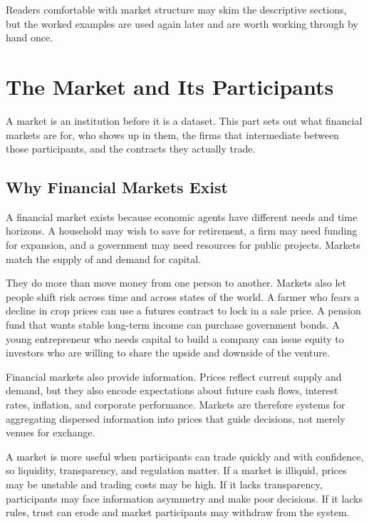 \documentclass[../ai_in_finance]{subfiles}
\begin{document}
Readers comfortable with market structure may skim the descriptive sections, but the worked examples are used again later and are worth working through by hand once.

\section{The Market and Its Participants}

A market is an institution before it is a dataset. This part sets out what financial markets are for, who shows up in them, the firms that intermediate between those participants, and the contracts they actually trade.

\subsection{Why Financial Markets Exist}

A financial market exists because economic agents have different needs and time horizons. A household may wish to save for retirement, a firm may need funding for expansion, and a government may need resources for public projects. Markets match the supply of and demand for capital.

They do more than move money from one person to another. Markets also let people shift risk across time and across states of the world. A farmer who fears a decline in crop prices can use a futures contract to lock in a sale price. A pension fund that wants stable long-term income can purchase government bonds. A young entrepreneur who needs capital to build a company can issue equity to investors who are willing to share the upside and downside of the venture.

Financial markets also provide information. Prices reflect current supply and demand, but they also encode expectations about future cash flows, interest rates, inflation, and corporate performance. Markets are therefore systems for aggregating dispersed information into prices that guide decisions, not merely venues for exchange.

A market is more useful when participants can trade quickly and with confidence, so liquidity, transparency, and regulation matter. If a market is illiquid, prices may be unstable and trading costs may be high. If it lacks transparency, participants may face information asymmetry and make poor decisions. If it lacks rules, trust can erode and market participants may withdraw from the system.
\end{document}
